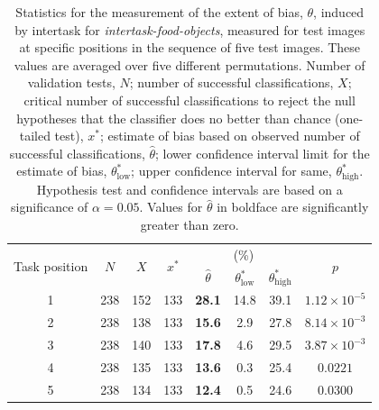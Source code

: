 \documentclass{sigchi}
\begin{document}
\begin{table}
\begin{center}
\begin{tabular}{c c c c c c c c }
	\toprule
	\multirow{2}{*}{Task position} & \multirow{2}{*}{$N$} & 
	\multirow{2}{*}{$X$} & \multirow{2}{*}{$x^*$} & \multicolumn{3}{c}{(\%)}
		& \multirow{2}{*}{$p$}\\ \cline{5-7}\noalign{\smallskip}
	& & & & $\hat{\theta}$ & $\theta^*_\mathrm{low}$ 
		& $\theta^*_\mathrm{high}$  \\
	\midrule
	1 & 238 & 152 & 133 & \textbf{28.1} & 14.8 & 39.1 
		& $1.12 \times 10^{-5}$\\
	2 & 238 & 138 & 133 & \textbf{15.6} & 2.9 & 27.8  
		& $8.14 \times 10^{-3}$\\
	3 & 238 & 140 & 133 & \textbf{17.8} & 4.6 & 29.5  
		& $3.87 \times 10^{-3}$\\
	4 & 238 & 135 & 133 & \textbf{13.6} & 0.3 & 25.4  
		& $0.0221$ \\
	5 & 238 & 134 & 133 & \textbf{12.4} & 0.5 & 24.6 & $0.0300$ \\
	\bottomrule
\end{tabular}
\caption{Statistics for the measurement of the extent of bias, $\theta$,
	induced by intertask for \textit{intertask-food-objects}, measured 
	for test images at specific positions in the sequence of five test images.
	These values are averaged over five different permutations.
	Number of validation tests, $N$; number of successful classifications, 
	$X$; critical number of successful classifications to reject the null 
	hypotheses that the classifier does no better than chance 
	(one-tailed test), $x^*$; 
	estimate of bias based on observed number of successful
	classifications, $\hat{\theta}$; lower confidence interval limit
	for the estimate of bias, $\theta^*_\mathrm{low}$; upper confidence 
	interval for same, $\theta^*_\mathrm{high}$.  Hypothesis test and 
	confidence intervals are based on a significance of $\alpha=0.05$.
	Values for $\hat{\theta}$ in boldface are significantly greater than zero.
}
\label{table:theta_pos}
\end{center}
\end{table}
\end{document}
